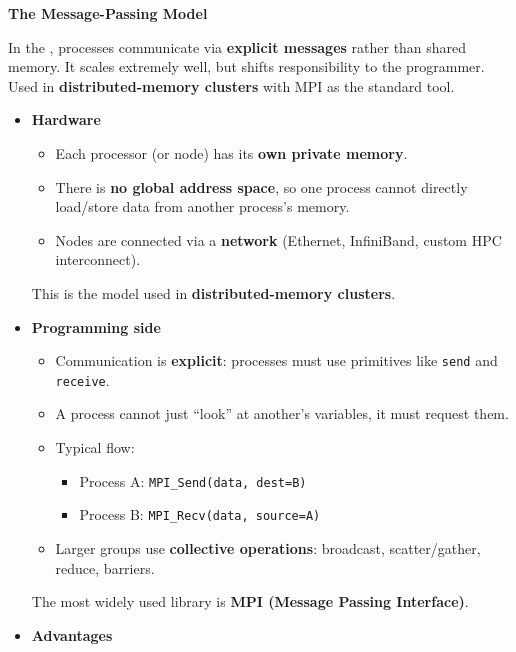 \highspace
\begin{flushleft}
    \textcolor{Green3}{ \textbf{The Message-Passing Model}}
\end{flushleft}
In the , processes communicate via \textbf{explicit messages} rather than shared memory. It scales extremely well, but shifts responsibility to the programmer. Used in \textbf{distributed-memory clusters} with MPI as the standard tool.
\begin{itemize}
    \item[\textcolor{Green3}{\faIcon{microchip}}] \textcolor{Green3}{\textbf{Hardware}}
    \begin{itemize}
        \item Each processor (or node) has its \textbf{own private memory}.
        \item There is \textbf{no global address space}, so one process cannot directly load/store data from another process's memory.
        \item Nodes are connected via a \textbf{network} (Ethernet, InfiniBand, custom HPC interconnect).
    \end{itemize}
    This is the model used in \textbf{distributed-memory clusters}.
    \item[\textcolor{Green3}{\faIcon{code}}] \textcolor{Green3}{\textbf{Programming side}}
    \begin{itemize}
        \item Communication is \textbf{explicit}: processes must use primitives like \texttt{send} and \texttt{receive}.
        \item A process cannot just ``look'' at another's variables, it must request them.
        \item Typical flow:
        \begin{itemize}
            \item Process A: \texttt{MPI\_Send(data, dest=B)}
            \item Process B: \texttt{MPI\_Recv(data, source=A)}
        \end{itemize}
        \item Larger groups use \textbf{collective operations}: broadcast, scatter/\break gather, reduce, barriers.
    \end{itemize}
    The most widely used library is \textbf{MPI (Message Passing Interface)}.
    \item[\textcolor{Green3}{\faIcon{check-circle}}] \textcolor{Green3}{\textbf{Advantages}}
    \begin{itemize}

\end{itemize}
\end{itemize}
